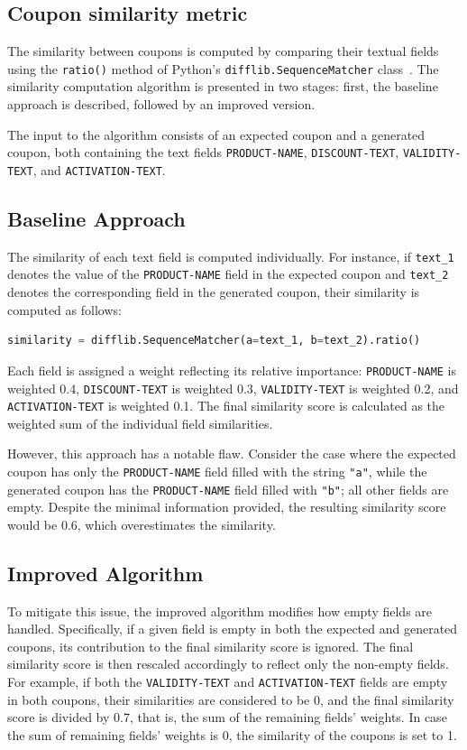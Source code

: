 \documentclass[licencjacka,en]{pracamgr}
\begin{document}
\begin{appendices}
\chapter{Coupon similarity metric} \label{app:coupon_sim}
The similarity between coupons is computed by comparing their textual fields using the \texttt{ratio()} method of Python's \texttt{difflib.SequenceMatcher} class~\cite{python-difflib}. The similarity computation algorithm is presented in two stages: first, the baseline approach is described, followed by an improved version.

The input to the algorithm consists of an expected coupon and a generated coupon, both containing the text fields \texttt{PRODUCT-NAME}, \texttt{DISCOUNT-TEXT}, \texttt{VALIDITY-TEXT}, and \texttt{ACTIVATION-TEXT}.

\section{Baseline Approach}
The similarity of each text field is computed individually. For instance, if \texttt{text\_1} denotes the value of the \texttt{PRODUCT-NAME} field in the expected coupon and \texttt{text\_2} denotes the corresponding field in the generated coupon, their similarity is computed as follows:

\begin{lstlisting}[language=Python]
similarity = difflib.SequenceMatcher(a=text_1, b=text_2).ratio()
\end{lstlisting}

Each field is assigned a weight reflecting its relative importance: \texttt{PRODUCT-NAME} is weighted 0.4, \texttt{DISCOUNT-TEXT} is weighted 0.3, \texttt{VALIDITY-TEXT} is weighted 0.2, and \texttt{ACTIVATION-TEXT} is weighted 0.1. The final similarity score is calculated as the weighted sum of the individual field similarities.

However, this approach has a notable flaw. Consider the case where the expected coupon has only the \texttt{PRODUCT-NAME} field filled with the string \texttt{"a"}, while the generated coupon has the \texttt{PRODUCT-NAME} field filled with \texttt{"b"}; all other fields are empty. Despite the minimal information provided, the resulting similarity score would be 0.6, which overestimates the similarity.

\section{Improved Algorithm}
To mitigate this issue, the improved algorithm modifies how empty fields are handled. Specifically, if a given field is empty in both the expected and generated coupons, its contribution to the final similarity score is ignored. The final similarity score is then rescaled accordingly to reflect only the non-empty fields. For example, if both the \texttt{VALIDITY-TEXT} and \texttt{ACTIVATION-TEXT} fields are empty in both coupons, their similarities are considered to be 0, and the final similarity score is divided by 0.7, that is, the sum of the remaining fields' weights. In case the sum of remaining fields' weights is 0, the similarity of the coupons is set to 1.


\end{appendices}
\end{document}
